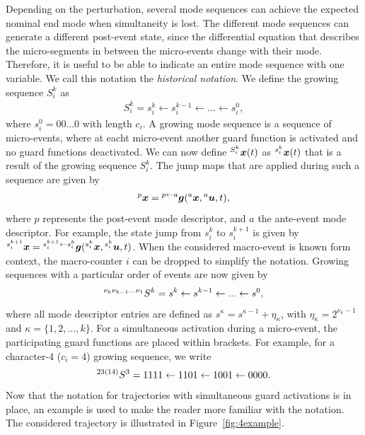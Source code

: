 \documentclass[../DC2017114Bouma.tex]{subfiles}
\begin{document}
Depending on the perturbation, several mode sequences can achieve the expected nominal end mode when simultaneity is lost. The different mode sequences can generate a different post-event state, since the differential equation that describes the micro-segments in between the micro-events change with their mode. Therefore, it is useful to be able to indicate an entire mode sequence with one variable. We call this notation the \textit{historical notation}. We define the growing sequence $S^k_i$ as 
\begin{align}
S^k_i = s^k_i\leftarrow s^{k-1}_i\leftarrow ... \leftarrow s^0_i,
\end{align}
where $s^0_i = 00...0$ with length $c_i$. A growing mode sequence is a sequence of micro-events, where at eacht micro-event another guard function is activated and no guard functions deactivated. We can now define $\hspace{0cm}^{S^k_i}{\boldsymbol{x}}(t)$ as $\hspace{0cm}^{s^k_i}{\boldsymbol{x}}(t)$ that is a result of the growing sequence $S^k_i$. The jump maps that are applied during such a sequence are given by
\begin{align}
\hspace{0cm}^{p}{\boldsymbol{x}} = \hspace{0cm}^{p\leftarrow a}{\boldsymbol{g}}(\hspace{0cm}^{a}{\boldsymbol{x}},\hspace{0cm}^{a}{\boldsymbol{u}},t),
\end{align}
where $p$ represents the post-event mode descriptor, and $a$ the ante-event mode descriptor. For example, the state jump from $s_i^k$ to $s_i^{k+1}$ is given by $\hspace{0cm}^{s_i^{k+1}}{\boldsymbol{x}} = \hspace{0cm}^{s_i^{k+1}\leftarrow s_i^k}{\boldsymbol{g}}(\hspace{0cm}^{s_i^k}{\boldsymbol{x}},\hspace{0cm}^{s_i^k}{\boldsymbol{u}},t)$. When the considered macro-event is known form context, the macro-counter $i$ can be dropped to simplify the notation. Growing sequences with a particular order of events are now given by
\begin{align}
\hspace{0cm}^{\nu_k \nu_{k-1}...\nu_{1}}S^k = s^k \leftarrow s^{k-1} \leftarrow ... \leftarrow s^0,
\end{align}
where all mode descriptor entries are defined as $s^{\kappa} = s^{\kappa-1} + \eta_{\kappa}$, with $\eta_{\kappa} = 2^{\nu_{\kappa}-1}$ and $\kappa = \{1,2,...,k\}$. For a simultaneous activation during a micro-event, the participating guard functions are placed within brackets. For example, for a character-4 ($c_i = 4$) growing sequence, we write 
\begin{align}
\hspace{0cm}^{23(14)}S^3 = 1111 \leftarrow 1101 \leftarrow 1001 \leftarrow 0000.
\end{align}
%
Now that the notation for trajectories with simultaneous guard activations is in place, an example is used to make the reader more  familiar with the notation. The considered trajectory is illustrated in Figure~\ref{fig:4example}. 
\end{document}
